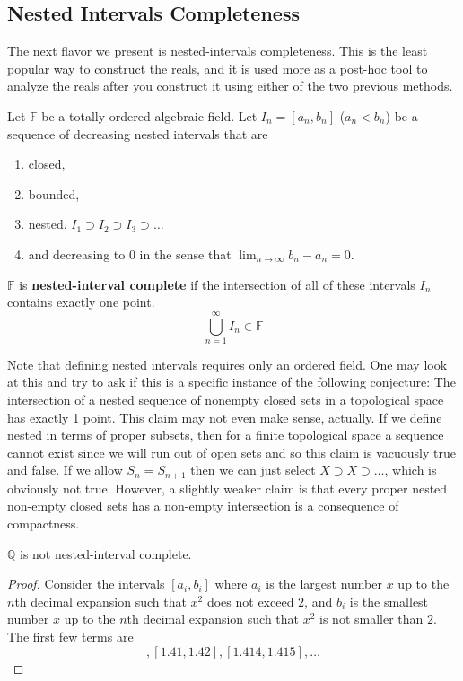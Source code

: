 \subsection{Nested Intervals Completeness}

  The next flavor we present is nested-intervals completeness.  This is the least popular way to construct the reals, and it is used more as a post-hoc tool to analyze the reals after you construct it using either of the two previous methods. 

  \begin{definition}
    Let $\mathbb{F}$ be a totally ordered algebraic field. Let $I_n= [a_n, b_n]$ ($a_n < b_n$) be a sequence of decreasing nested intervals that are 
    \begin{enumerate}
      \item closed, 
      \item bounded, 
      \item nested, $I_1 \supset I_2 \supset I_3 \supset \ldots$ 
      \item and decreasing to $0$ in the sense that $\lim_{n \to \infty} b_n - a_n = 0$. 
    \end{enumerate}
    $\mathbb{F}$ is \textbf{nested-interval complete} if the intersection of all of these intervals $I_n$ contains exactly one point. 
    \begin{equation}
      \bigcup_{n=1}^\infty I_n \in \mathbb{F}
    \end{equation}
  \end{definition}

  Note that defining nested intervals requires only an ordered field. One may look at this and try to ask if this is a specific instance of the following conjecture: The intersection of a nested sequence of nonempty closed sets in a topological space has exactly 1 point. This claim may not even make sense, actually. If we define nested in terms of proper subsets, then for a finite topological space a sequence cannot exist since we will run out of open sets and so this claim is vacuously true and false. If we allow $S_n = S_{n+1}$ then we can just select $X \supset X \supset \ldots$, which is obviously not true. However, a slightly weaker claim is that every proper nested non-empty closed sets has a non-empty intersection is a consequence of compactness. 

  \begin{theorem}
    $\mathbb{Q}$ is not nested-interval complete. 
  \end{theorem}
  \begin{proof}
    Consider the intervals $[a_i, b_i]$ where $a_i$ is the largest number $x$ up to the $n$th decimal expansion such that $x^2$ does not exceed $2$, and $b_i$ is the smallest number $x$ up to the $n$th decimal expansion such that $x^2$ is not smaller than $2$. The first few terms are 
    \begin{equation}
      [1.4, 1.5], [1.41, 1.42], [1.414, 1.415], \ldots
    \end{equation}
  \end{proof}

